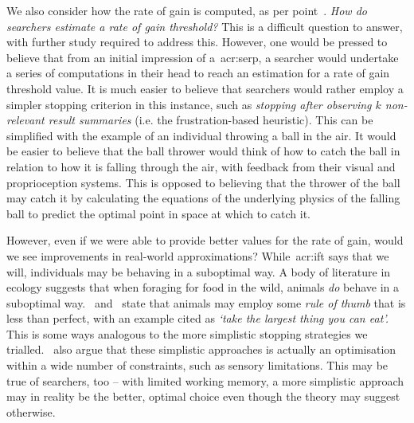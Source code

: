 We also consider how the rate of gain is computed, as per point~. \emph{How do searchers estimate a rate of gain threshold?} This is a difficult question to answer, with further study required to address this. However, one would be pressed to believe that from an initial impression of a~\gls{acr:serp}, a searcher would undertake a series of computations in their head to reach an estimation for a rate of gain threshold value. It is much easier to believe that searchers would rather employ a simpler stopping criterion in this instance, such as \emph{stopping after observing $k$ non-relevant result summaries} (i.e. the frustration-based heuristic). This can be simplified with the example of an individual throwing a ball in the air. It would be easier to believe that the ball thrower would think of how to catch the ball in relation to how it is falling through the air, with feedback from their visual and proprioception systems. This is opposed to believing that the thrower of the ball may catch it by calculating the equations of the underlying physics of the falling ball to predict the optimal point in space at which to catch it.

However, even if we were able to provide better values for the rate of gain, would we see improvements in real-world approximations? While~\gls{acr:ift} says that we will, individuals may be behaving in a suboptimal way. A body of literature in ecology suggests that when foraging for food in the wild, animals \emph{do} behave in a suboptimal way.~\cite{janetos1981imperfectly} and~\cite{krebs1983perspectives} state that animals may employ some \emph{rule of thumb} that is less than perfect, with an example cited as \emph{`take the largest thing you can eat'.} This is some ways analogous to the more simplistic stopping strategies we trialled.~\cite{krebs1983perspectives} also argue that these simplistic approaches is actually an optimisation within a wide number of constraints, such as sensory limitations. This may be true of searchers, too -- with limited working memory, a more simplistic approach may in reality be the better, optimal choice even though the theory may suggest otherwise.

